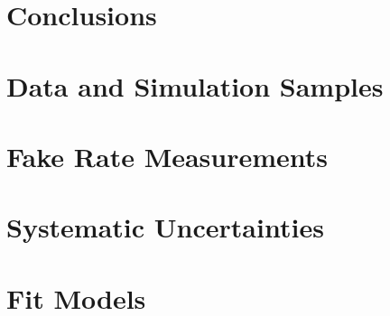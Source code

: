\documentclass[phd,black]{PrincetonThesis}
\begin{document}
\chapter{Conclusions}
\label{chap:conclusions}




\appendix
\chapter{Data and Simulation Samples}
\label{app:data}


\chapter{Fake Rate Measurements}
\label{app:ffmeas}


\chapter{Systematic Uncertainties}
\label{app:sysunc}


\chapter{Fit Models}
\label{app:fitmodel}


\cleardoublepage
\end{document}
